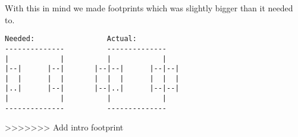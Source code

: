 With this in mind we made footprints which was slightly bigger than it needed to.

\begin{verbatim}
Needed:                 Actual:
--------------          --------------
|            |          |            |
|--|      |--|       |--|--|      |--|--|
|  |      |  |       |  |  |      |  |  |
|..|      |--|       |--|..|      |--|--|
|            |          |            |
--------------          --------------
\end{verbatim}
>>>>>>> Add intro footprint
